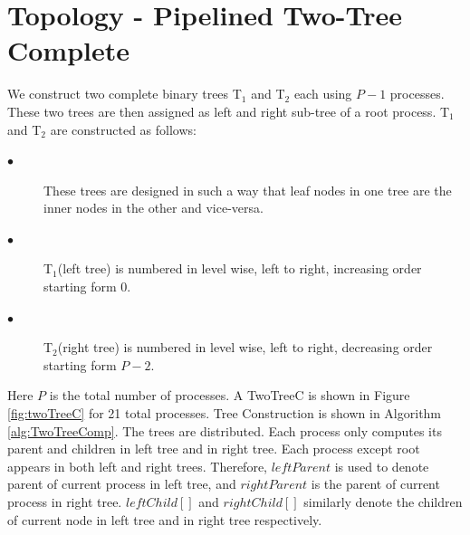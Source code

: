\documentclass[sigplan,review,anonymous]{acmart}\settopmatter{printfolios=true,printccs=false,printacmref=false}
\begin{document}
\section{Topology - Pipelined Two-Tree Complete}\label{sec:Topology}
 We construct two complete binary trees T$_{1}$ and T$_{2}$ each using $P-1$ processes. These two trees are then assigned as left and right sub-tree of a root process. T$_{1}$ and T$_{2}$ are constructed as follows:
\begin{description}
    \item[$\bullet$]These trees are designed in such a way that leaf nodes in one tree are the inner nodes in the other and vice-versa.
    \item[$\bullet$]T$_{1}$(left tree) is numbered in level wise, left to right, increasing order starting form $0$.
    \item[$\bullet$]T$_{2}$(right tree) is numbered in level wise, left to right, decreasing order starting form $P-2$.
\end{description}
 Here $P$ is the total number of processes. A TwoTreeC is shown in Figure \ref{fig:twoTreeC} for 21 total processes. Tree Construction is shown in Algorithm \ref{alg:TwoTreeComp}. The trees are distributed. Each process only computes its parent and children in left tree and in right tree. Each process except root appears in both left and right trees. Therefore, $leftParent$ is used to denote parent of current process in left tree, and $rightParent$ is the parent of current process in right tree. $leftChild[]$ and $rightChild[]$ similarly denote the children of current node in left tree and in right tree respectively.\\
 
\end{document}

